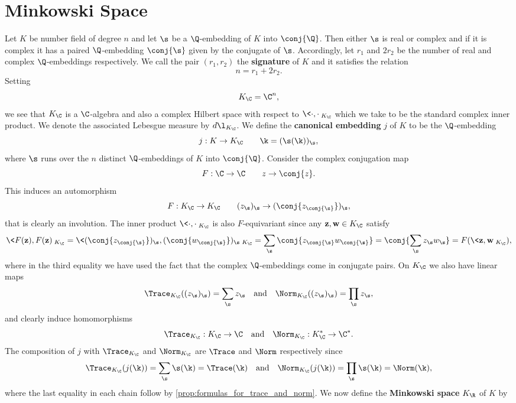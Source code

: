   \section{Minkowski Space}
    Let $K$ be number field of degree $n$ and let $\s$ be a $\Q$-embedding of $K$ into $\conj{\Q}$. Then either $\s$ is real or complex and if it is complex it has a paired $\Q$-embedding $\conj{\s}$ given by the conjugate of $\s$. Accordingly, let $r_{1}$ and $2r_{2}$ be the number of real and complex $\Q$-embeddings respectively. We call the pair $(r_{1},r_{2})$ the \textbf{signature} of $K$ and it satisfies the relation
    \[
      n = r_{1}+2r_{2}.
    \]
    Setting
    \[
      K_{\C} = \C^{n},
    \]
    we see that $K_{\C}$ is a $\C$-algebra and also a complex Hilbert space with respect to $\<\cdot,\cdot\>_{K_{\C}}$ which we take to be the standard complex inner product. We denote the associated Lebesgue measure by $d\l_{K_{\C}}$. We define the \textbf{canonical embedding} $j$ of $K$ to be the $\Q$-embedding
    \[
      j:K \to K_{\C} \qquad \k = (\s(\k))_{\s},
    \]
    where $\s$ runs over the $n$ distinct $\Q$-embeddings of $K$ into $\conj{\Q}$. Consider the complex conjugation map
    \[
      F:\C \to \C \qquad z \to \conj{z}.
    \]
    This induces an automorphism
    \[
      F:K_{\C} \to K_{\C} \qquad (z_{\s})_{\s} \to (\conj{z_{\conj{\s}}})_{\s},
    \]
    that is clearly an involution. The inner product $\<\cdot,\cdot\>_{K_{\C}}$ is also $F$-equivariant since any $\mathbf{z},\mathbf{w} \in K_{\C}$ satisfy
    \[
      \<F(\mathbf{z}),F(\mathbf{z})\>_{K_{\C}} = \<(\conj{z_{\conj{\s}}})_{\s},(\conj{w_{\conj{\s}}})_{\s}\>_{K_{\C}} = \sum_{\s}\conj{z_{\conj{\s}}w_{\conj{\s}}} = \conj{\sum_{\s}z_{\s}w_{\s}} = F(\<\mathbf{z},\mathbf{w}\>_{K_{\C}}),
    \]
    where in the third equality we have used the fact that the complex $\Q$-embeddings come in conjugate pairs. On $K_{\C}$ we also have linear maps
    \[
      \Trace_{K_{\C}}((z_{\s})_{\s}) = \sum_{\s}z_{\s} \quad \text{and} \quad \Norm_{K_{\C}}((z_{\s})_{\s}) = \prod_{\s}z_{\s},
    \]
    and clearly induce homomorphisms
    \[
      \Trace_{K_{\C}}:K_{\C} \to \C \quad \text{and} \quad \Norm_{K_{\C}}:K_{\C}^{\ast} \to \C^{\ast}.
    \]
    The composition of $j$ with $\Trace_{K_{\C}}$ and $\Norm_{K_{\C}}$ are $\Trace$ and $\Norm$ respectively since
    \[
      \Trace_{K_{\C}}(j(\k)) = \sum_{\s}\s(\k) = \Trace(\k) \quad \text{and} \quad \Norm_{K_{\C}}(j(\k)) = \prod_{\s}\s(\k) = \Norm(\k),
    \]
    where the last equality in each chain follow by \cref{prop:formulas_for_trace_and_norm}. We now define the \textbf{Minkowski space} $K_{\R}$ of $K$ by
